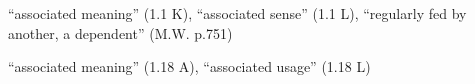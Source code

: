 \documentclass[10pt]{article}
\begin{document}
\begin{multicols}{2}
\begin{enumerate}[
			leftmargin=0em,
			rightmargin=0em,
		]










		 ``associated meaning'' (1.1 K), ``associated sense'' (1.1 L), ``regularly fed by another, a dependent'' (M.W. p.751)
		\begin{itemize}
			 ``associated meaning'' (1.18 A), ``associated usage'' (1.18 L)
		\end{itemize}




\end{enumerate}
\end{multicols}
\end{document}
